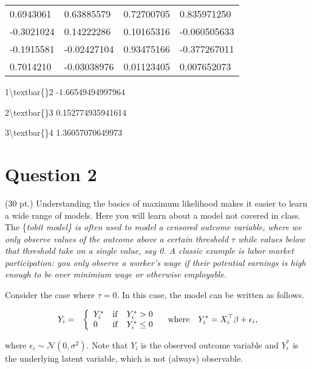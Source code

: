 \documentclass{article}
\begin{document}
    \begin{tabular}{llll}
      0.6943061   &  0.63885579  & 0.72700705   &  0.835971250\\
     -0.3021024   &  0.14222286  & 0.10165316   & -0.060505633\\
     -0.1915581   & -0.02427104  & 0.93475166   & -0.377267011\\
      0.7014210   & -0.03038976  & 0.01123405   &  0.007652073\\
\end{tabular}

    
    \begin{description*}
\item[1\textbackslash{}textbar\{\}2] -1.66549494997964
\item[2\textbackslash{}textbar\{\}3] 0.152774935941614
\item[3\textbackslash{}textbar\{\}4] 1.36057070649973
\end{description*}

    
    \section{Question 2}\label{question-2}

    (30 pt.) Understanding the basics of maximum likelihood makes it easier
to learn a wide range of models. Here you will learn about a model not
covered in class. The \{\it tobit model\} is often used to model a
censored outcome variable, where we only observe values of the outcome
above a certain threshold \(\tau\) while values below that threshold
take on a single value, say 0. A classic example is labor market
participation: you only observe a worker's wage if their potential
earnings is high enough to be over minimium wage or otherwise
employable.

Consider the case where \(\tau=0\). In this case, the model can be
written as follows.

\begin{eqnarray*}
    Y_i & = & \left\{ \begin{array}{ll}
                    Y_i^\ast & {\rm if} \quad Y_i^\ast > 0 \\
                    0 & {\rm if} \quad Y_i^\ast \le 0 \end{array} \right.
                    \quad {\rm where} \quad Y_i^\ast = X_i^\top \beta + \epsilon_i,
  \end{eqnarray*}

where \(\epsilon_i \sim \mathcal{N}(0, \sigma^2)\). Note that \(Y_i\) is
the observed outcome variable and \(Y_i^\ast\) is the underlying latent
variable, which is not (always) observable.
\end{document}
